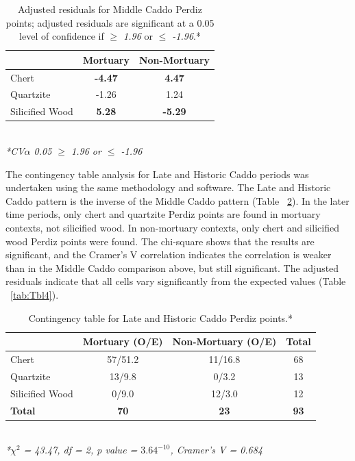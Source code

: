 \documentclass[review]{elsarticle}
\begin{document}
\begin{table}[tbh]\centering
\footnotesize
\caption{Adjusted residuals for Middle Caddo Perdiz points; adjusted residuals are significant at a 0.05 level of confidence if \textit{$\geq$ 1.96} or \textit{$\leq$ -1.96}.*}
\centering
\begin{tabular}{lcc}
\hline
 & Mortuary & Non-Mortuary\\
\hline
Chert & \textbf{-4.47} & \textbf{4.47}\\
Quartzite & -1.26 & 1.24\\
Silicified Wood & \textbf{5.28} & \textbf{-5.29}\\
\hline
\end{tabular}\\
\textit{*CV$\alpha$ 0.05 $\geq$ 1.96 or $\leq$ -1.96}
\label{tab:Tbl2}
\end{table}

The contingency table analysis for Late and Historic Caddo periods was undertaken using the same methodology and software. The Late and Historic Caddo pattern is the inverse of the Middle Caddo pattern (Table ~\ref{tab:Tbl3}). In the later time periods, only chert and quartzite Perdiz points are found in mortuary contexts, not silicified wood. In non-mortuary contexts, only chert and silicified wood Perdiz points were found. The chi-square shows that the results are significant, and the Cramer’s V correlation indicates the correlation is weaker than in the Middle Caddo comparison above, but still significant. The adjusted residuals indicate that all cells vary significantly from the expected values (Table ~\ref{tab:Tbl4}).

\begin{table}[tbh]\centering
\footnotesize
\caption{Contingency table for Late and Historic Caddo Perdiz points.*}
\centering
\begin{tabular}{lccc}
\hline
 & Mortuary (O/E) & Non-Mortuary (O/E) & Total\\
\hline
Chert & 57/51.2 & 11/16.8 & 68\\
Quartzite & 13/9.8 & 0/3.2 & 13\\
Silicified Wood & 0/9.0 & 12/3.0 & 12\\
\hline
\textbf{Total} & \textbf{70} & \textbf{23} & \textbf{93}\\
\hline
\end{tabular}\\
\textit{*$\chi^{2}$ = 43.47, df = 2, p value = $3.64^{-10}$, Cramer’s V  = 0.684}
\label{tab:Tbl3}
\end{table}
\end{document}
